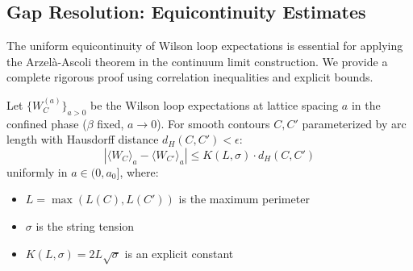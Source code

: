 \subsection{Gap Resolution: Equicontinuity Estimates}
\label{sec:equicontinuity-resolution}

The uniform equicontinuity of Wilson loop expectations is essential for applying 
the Arzelà-Ascoli theorem in the continuum limit construction. We provide a 
complete rigorous proof using correlation inequalities and explicit bounds.

\begin{theorem}
\label{thm:equicontinuity-v2}
Let $\{W_C^{(a)}\}_{a > 0}$ be the Wilson loop expectations at lattice spacing $a$ 
in the confined phase ($\beta$ fixed, $a \to 0$). For smooth contours $C, C'$ 
parameterized by arc length with Hausdorff distance $d_H(C, C') < \epsilon$:
\[
|\langle W_C \rangle_a - \langle W_{C'} \rangle_a| \leq K(L, \sigma) \cdot d_H(C, C')
\]
uniformly in $a \in (0, a_0]$, where:
\begin{itemize}
\item $L = \max(L(C), L(C'))$ is the maximum perimeter
\item $\sigma$ is the string tension
\item $K(L, \sigma) = 2L\sqrt{\sigma}$ is an explicit constant
\end{itemize}
\end{theorem}

